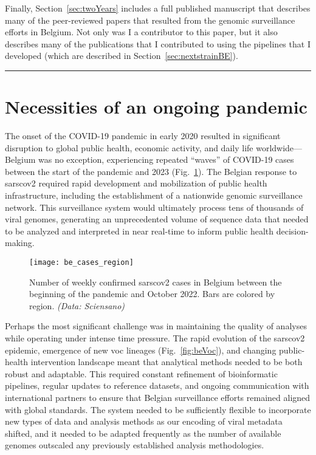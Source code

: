 Finally, Section~\ref{sec:twoYears} includes a full published manuscript that describes many of the peer-reviewed papers that resulted from the genomic surveillance efforts in Belgium. Not only was I a contributor to this paper, but it also describes many of the publications that I contributed to using the pipelines that I developed (which are described in Section~\ref{sec:nextstrainBE}).

\vspace*{12pt}
\hrule
\onehalfspacing


\section{Necessities of an ongoing pandemic}\label{sec:mm-intro}
The onset of the COVID-19 pandemic in early 2020 resulted in significant disruption to global public health, economic activity, and daily life worldwide---Belgium was no exception, experiencing repeated ``waves'' of COVID-19 cases between the start of the pandemic and 2023 (Fig.~\ref{fig:beCaseCountsRegion}).
The Belgian response to \gls{sarscov2} required rapid development and mobilization of public health infrastructure, including the establishment of a nationwide genomic surveillance network.
This surveillance system would ultimately process tens of thousands of viral genomes, generating an unprecedented volume of sequence data that needed to be analyzed and interpreted in near real-time to inform public health decision-making.

\begin{figure}[ht]
  \centering
  \texttt{[image: be\_cases\_region]}
  \caption[COVID-19 cases in Belgium by province]{Number of weekly confirmed \gls{sarscov2} cases in Belgium between the beginning of the pandemic and October 2022. Bars are colored by region. \textit{(Data: Sciensano)}}
  \label{fig:beCaseCountsRegion}
\end{figure}

Perhaps the most significant challenge was in maintaining the quality of analyses while operating under intense time pressure.
The rapid evolution of the \gls{sarscov2} epidemic, emergence of new \gls{voc} lineages (Fig.~\ref{fig:beVoc}), and changing public-health intervention landscape meant that analytical methods needed to be both robust and adaptable.
This required constant refinement of bioinformatic pipelines, regular updates to reference datasets, and ongoing communication with international partners to ensure that Belgian surveillance efforts remained aligned with global standards.
The system needed to be sufficiently flexible to incorporate new types of data and analysis methods as our encoding of viral metadata shifted, and it needed to be adapted frequently as the number of available genomes outscaled any previously established analysis methodologies.

